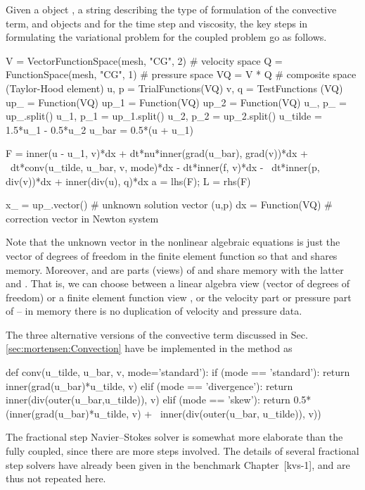 Given a  object , a string  describing
the type of formulation of the convective term, and 
objects  and  for the time step and viscosity, the key
steps in formulating the variational problem for the coupled problem
go as follows.
\begin{python}
V = VectorFunctionSpace(mesh, "CG", 2)  # velocity space
Q = FunctionSpace(mesh, "CG", 1)        # pressure space
VQ = V * Q  # composite space (Taylor-Hood element)
u, p = TrialFunctions(VQ)
v, q = TestFunctions (VQ)
up_  = Function(VQ)
up_1 = Function(VQ)
up_2 = Function(VQ)
u_, p_ = up_.split()
u_1, p_1 = up_1.split()
u_2, p_2 = up_2.split()
u_tilde = 1.5*u_1 - 0.5*u_2
u_bar = 0.5*(u + u_1)

F  = inner(u - u_1, v)*dx + dt*nu*inner(grad(u_bar), grad(v))*dx + \
     dt*conv(u_tilde, u_bar, v, mode)*dx - dt*inner(f, v)*dx - \
     dt*inner(p, div(v))*dx + inner(div(u), q)*dx
a = lhs(F); L = rhs(F)

x_ = up_.vector()  # unknown solution vector (u,p)
dx = Function(VQ)  # correction vector in Newton system
\end{python}
Note that the unknown vector  in the nonlinear algebraic
equations is just the vector of degrees of freedom in the 
finite element function so that \emp{up\_} and  shares
memory. Moreover, \emp{u\_} and \emp{p\_} are parts (views) of
 and share memory with the latter and \emp{x\_}.  That is,
we can choose between a linear algebra view \emp{x\_} (vector of
degrees of freedom) or a finite element function view , or
the velocity part \emp{u\_} or pressure part \emp{p\_} of \emp{up\_}
-- in memory there is no duplication of velocity and pressure data.

The three alternative versions of the convective term discussed in
Sec. \ref{sec:mortensen:Convection} have be implemented in the method
\emp{conv} as
\begin{python}
def conv(u_tilde, u_bar, v, mode='standard'):
    if (mode == 'standard'):
        return inner(grad(u_bar)*u_tilde, v)
    elif (mode == 'divergence'):
        return inner(div(outer(u_bar,u_tilde)), v)
    elif (mode == 'skew'):
        return 0.5*(inner(grad(u_bar)*u_tilde, v) + \
        inner(div(outer(u_bar, u_tilde)), v))
\end{python}
The fractional step Navier--Stokes solver is somewhat more elaborate
than the fully coupled, since there are more steps involved. The
details of several fractional step solvers have already been given in
the benchmark Chapter~[kvs-1], and are thus not repeated here.


